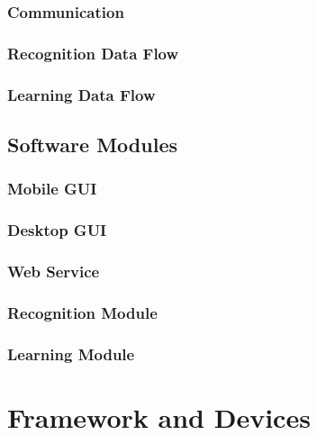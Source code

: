 \subsubsection{Communication}
\label{sec:communication}

\subsubsection{Recognition Data Flow}
\label{sec:arch:recognitiondataflow}

\subsubsection{Learning Data Flow}
\label{sec:arch:learningdataflow}

\subsection{Software Modules}
\label{sec:arch:softwaremodules}

\subsubsection{Mobile GUI}
\label{sec:arch:mobilegui}

\subsubsection{Desktop GUI}
\label{sec:arch:desktopgui}

\subsubsection{Web Service}
\label{sec:arch:webservice}

\subsubsection{Recognition Module}
\label{sec:arch:recognitionmodule}

\subsubsection{Learning Module}
\label{sec:arch:learningmodule}

\section{Framework and Devices}
\label{sec:frameworkanddevices}

